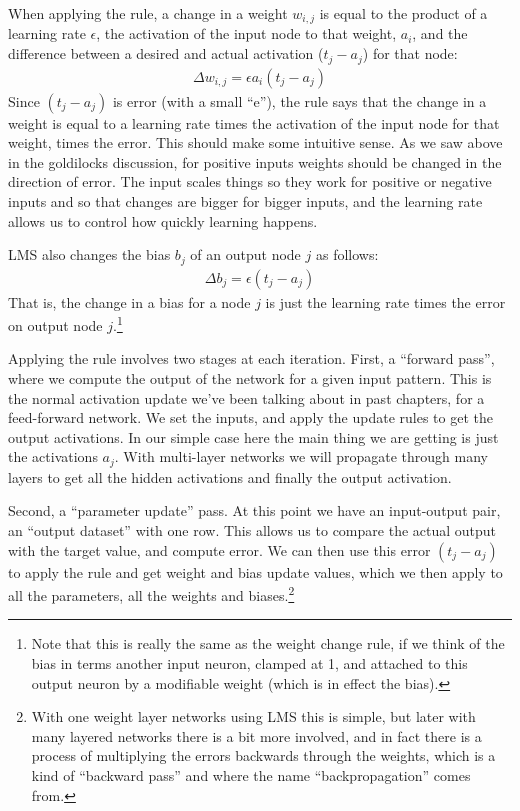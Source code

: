 When applying the rule, a change in a weight $w_{i,j}$ is equal to the product of a learning rate $\epsilon$, the activation of the input node to that weight, $a_i$, and the difference between a desired and actual activation ($t_j - a_j$) for that node:
\begin{eqnarray*}
\Delta w_{i,j}  =  \epsilon a_i (t_j - a_j)
\end{eqnarray*}
Since $(t_j - a_j)$ is error  (with a small ``e''), the rule says that the change in a weight is equal to a learning rate times the activation of the input node for that weight, times the error. This should make some intuitive sense. As we saw above in the goldilocks discussion, for positive inputs weights should be changed in the direction of error. The input scales things so they work for positive or negative inputs and so that changes are bigger for bigger inputs, and the learning rate allows us to control how quickly learning happens. 

LMS also changes the bias $b_j$ of an output node $j$ as follows: 
\begin{eqnarray*}
\Delta b_j  =  \epsilon (t_j - a_j)
\end{eqnarray*}
That is, the change in a bias for a node $j$ is just the learning rate times the error on output node $j$.\footnote{Note that this is really the same as the weight change rule, if we think of the bias in terms another input neuron, clamped at 1, and attached to this output neuron by a modifiable weight (which is in effect the bias).}

Applying the rule involves two stages at each iteration. First, a ``forward pass'', where we compute the output of the network for a given input pattern. This is the normal activation update we've been talking about in past chapters, for a feed-forward network. We set the inputs, and apply the update rules to get the output activations. In our simple case here the main thing we are getting is just the activations $a_j$.  With multi-layer  networks we will propagate through many layers to get all the hidden activations and finally the output activation. 

Second, a ``parameter update'' pass. At this point we have an  input-output pair, an ``output dataset'' with one row.  This allows us to compare the actual output with the target value, and compute error. We can then use this error $ (t_j - a_j)$ to apply the rule and get weight and bias update values, which we then apply to all the parameters, all the weights and biases.\footnote{With one weight layer networks using LMS this is simple, but later with many layered networks there is a bit more involved, and in fact there is a process of multiplying the errors backwards through the weights, which is a kind of ``backward pass'' and where the name ``backpropagation'' comes from.}

